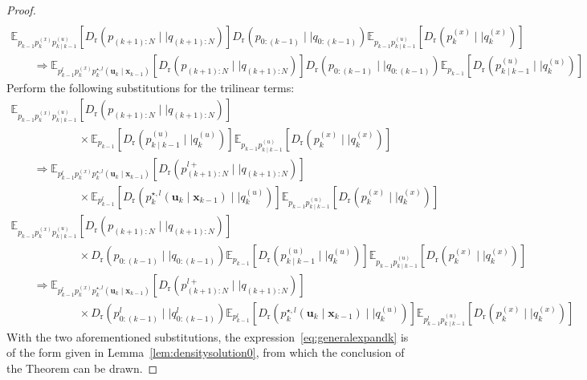 \documentclass[10pt,a4paper]{amsart}
\newcommand{\Dr}[2]{{D}_{\text{r}}\left(#1\mid \mid #2 \right)}
\newcommand{\E}{\mathbb{E}}
\newcommand{\bv}[1]{\mathbf{#1}}
\newcommand{\optimalpolicygen}[3]{p^{\star,{#3}}_{{#1}} \left(\bv{u}_{{#1}}\mid \bv{x}_{{#2}} \right)}
\newcommand{\shortplant}[1]{p_{{#1}}^{(x)}}
\newcommand{\shortpolicy}[2]{p_{{#1}\mid{#2}}^{(u)}}
\begin{document}
\begin{proof}
\[\begin{array}{l}
\\ \E_{p_{k-1}\shortplant{k}\shortpolicy{k}{k-1}}\left[\Dr{p_{(k+1):N}}{q_{(k+1):N}}\right] \Dr{p_{0:(k-1)}}{q_{0:(k-1)}}\E_{p_{k-1}\shortpolicy{k}{k-1}}\left[\Dr{\shortplant{k}}{q^{(x)}_k}\right] \\ \qquad \Rightarrow
  \E_{p^l_{k-1}\shortplant{k}\optimalpolicygen{k}{k-1}{l}}\left[\Dr{p_{(k+1):N}}{q_{(k+1):N}}\right] \Dr{p_{0:(k-1)}}{q_{0:(k-1)}}\E_{p_{k-1}}\left[\Dr{\shortpolicy{k}{k-1}}{q^{(u)}_k}\right] 
\end{array}
\]
Perform the following substitutions for the trilinear terms:
\[
\begin{array}{l}
\E_{p_{k-1}\shortplant{k}\shortpolicy{k}{k-1}}\left[\Dr{p_{(k+1):N}}{q_{(k+1):N}}\right] \\ 
\qquad\qquad\qquad \times
\E_{p_{k-1}}\left[\Dr{\shortpolicy{k}{k-1}}{q^{(u)}_k}\right]\E_{p_{k-1}\shortpolicy{k}{k-1}}\left[\Dr{\shortplant{k}}{q^{(x)}_k}\right]
\\
\qquad \Rightarrow 
\E_{p^l_{k-1}\shortplant{k}\optimalpolicygen{k}{k-1}{l}}\left[\Dr{p^{l+}_{(k+1):N}}{q_{(k+1):N}}\right] \\ 
\qquad\qquad\qquad \times
\E_{p^l_{k-1}}\left[\Dr{\optimalpolicygen{k}{k-1}{l}}{q^{(u)}_k}\right]\E_{p_{k-1}\shortpolicy{k}{k-1}}\left[\Dr{\shortplant{k}}{q^{(x)}_k}\right]
\\ 
 \E_{p_{k-1}\shortplant{k}\shortpolicy{k}{k-1}}\left[\Dr{p_{(k+1):N}}{q_{(k+1):N}}\right] \\ 
\qquad\qquad\qquad \times \Dr{p_{0:(k-1)}}{q_{0:(k-1)}}\E_{p_{k-1}}\left[\Dr{\shortpolicy{k}{k-1}}{q^{(u)}_k}\right]\E_{p_{k-1}\shortpolicy{k}{k-1}}\left[\Dr{\shortplant{k}}{q^{(x)}_k}\right] 
\\
\qquad \Rightarrow 
 \E_{p^l_{k-1}\shortplant{k}\optimalpolicygen{k}{k-1}{l}}\left[\Dr{p^{l+}_{(k+1):N}}{q_{(k+1):N}}\right] \\ 
\qquad\qquad\qquad \times \Dr{p^l_{0:(k-1)}}{q^l_{0:(k-1)}}\E_{p^l_{k-1}}\left[\Dr{\optimalpolicygen{k}{k-1}{l}}{q^{(u)}_k}\right]\E_{p^l_{k-1}\shortpolicy{k}{k-1}}\left[\Dr{\shortplant{k}}{q^{(x)}_k}\right] 
\end{array}
\]
With the two aforementioned substitutions, the expression~\eqref{eq:generalexpandk} is of the form given in Lemma~\ref{lem:densitysolution0}, from
which the conclusion of the Theorem can be drawn.

\end{proof}
\end{document}
